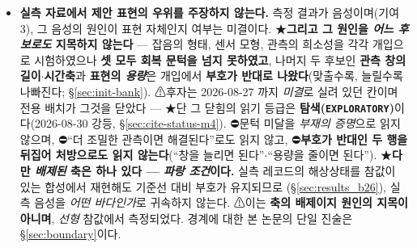 \documentclass[11pt]{report}
\numberwithin{equation}{chapter}
\numberwithin{figure}{chapter}
\numberwithin{table}{chapter}
\begin{document}
\begin{itemize}
  \item \textbf{실측 자료에서 제안 표현의 우위를 주장하지 않는다.}
        측정 결과가 음성이며(기여 3), 그 음성의 원인이 표현 자체인지 여부는 미결이다.
        ★\textbf{그리고 그 원인을 \emph{어느 후보로도} 지목하지 않는다} --- 잡음의 형태,
        센서 모형, 관측의 희소성을 각각 개입으로 시험하였으나 \textbf{셋 모두 회복 문턱을
        넘지 못하였고}, 나머지 두 후보인 \textbf{관측 창의 길이$\cdot$시간축}과
        \textbf{표현의 \emph{용량}}은 개입에서 \textbf{부호가 반대로 나왔다}(맞출수록,
        늘릴수록 나빠진다; \S\ref{sec:init-bank}). ⚠후자는 2026-08-27 까지 \emph{미결}로
        실려 있던 칸이며 전용 배치가 그것을 닫았다 --- ★단 그 닫힘의 읽기 등급은
        \textbf{탐색(\texttt{EXPLORATORY})}이다(2026-08-30 강등,
        \S\ref{sec:cite-status-m4}).
        ⛔문턱 미달을 \emph{부재의 증명}으로 읽지 않으며, ⛔``더 조밀한 관측이면
        해결된다''로도 읽지 않고, ⛔\textbf{부호가 반대인 두 행을 뒤집어 처방으로도 읽지
        않는다}(``창을 늘리면 된다''$\cdot$``용량을 줄이면 된다'').
        ★\textbf{다만 \emph{배제된} 축은 하나 있다 --- \emph{파랑 조건}이다.} 실측
        레코드의 해상상태를 참값이 있는 합성에서 재현해도 기준선 대비 부호가 유지되므로
        (\S\ref{sec:results_b26}), 실측 음성을 \emph{어떤 바다인가}로 귀속하지 않는다.
        ⚠이는 \textbf{축의 배제이지 원인의 지목이 아니며}, \emph{선형} 참값에서
        측정되었다. 경계에 대한 본 논문의 단일 진술은 \S\ref{sec:boundary}이다.

\end{itemize}
\end{document}
